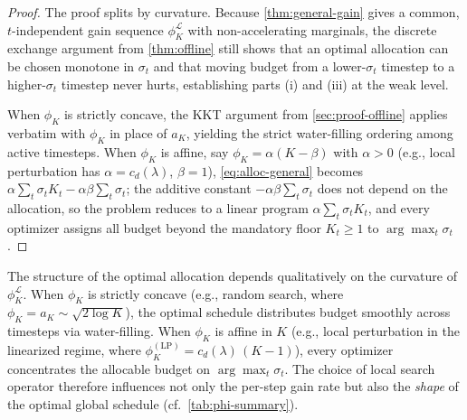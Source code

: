 %
\begin{proof}
The proof splits by curvature. Because \cref{thm:general-gain} gives a common, $t$-independent gain sequence $\phi_K^{\mathcal{L}}$ with non-accelerating marginals, the discrete exchange argument from \cref{thm:offline} still shows that an optimal allocation can be chosen monotone in $\sigma_t$ and that moving budget from a lower-$\sigma_t$ timestep to a higher-$\sigma_t$ timestep never hurts, establishing parts (i) and (iii) at the weak level.

When $\phi_K$ is strictly concave, the KKT argument from \cref{sec:proof-offline} applies verbatim with $\phi_K$ in place of $a_K$, yielding the strict water-filling ordering among active timesteps. When $\phi_K$ is affine, say $\phi_K = \alpha(K - \beta)$ with $\alpha > 0$ (e.g., local perturbation has $\alpha = c_d(\lambda)$, $\beta = 1$), \cref{eq:alloc-general} becomes $\alpha \sum_t \sigma_t K_t - \alpha\beta\sum_t \sigma_t$; the additive constant $-\alpha\beta\sum_t\sigma_t$ does not depend on the allocation, so the problem reduces to a linear program $\alpha \sum_t \sigma_t K_t$, and every optimizer assigns all budget beyond the mandatory floor $K_t \ge 1$ to $\arg\max_t \sigma_t$.
\end{proof}
%
\begin{remark}
\label{rmk:curvature}
The structure of the optimal allocation depends qualitatively on the curvature of $\phi_K^{\mathcal{L}}$. When $\phi_K$ is strictly concave (e.g., random search, where $\phi_K = a_K \sim \sqrt{2\log K}$), the optimal schedule distributes budget smoothly across timesteps via water-filling. When $\phi_K$ is affine in $K$ (e.g., local perturbation in the linearized regime, where $\phi_K^{(\mathrm{LP})} = c_d(\lambda)\,(K-1)$), every optimizer concentrates the allocable budget on $\arg\max_t \sigma_t$. The choice of local search operator therefore influences not only the per-step gain rate but also the \emph{shape} of the optimal global schedule (cf.\ \cref{tab:phi-summary}).
\end{remark}
%
